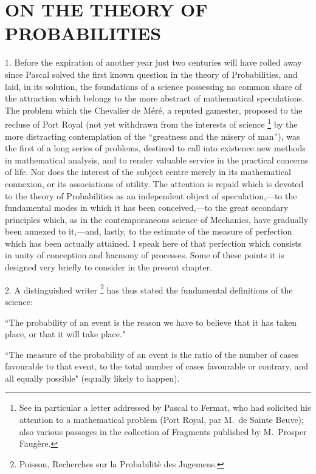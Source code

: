 \documentclass[oneside]{book}
\begin{document}
\chapter[ON THE THEORY OF PROBABILITIES.]{\large ON THE THEORY OF PROBABILITIES}

1. Before the expiration of another year just two centuries
will have rolled away since Pascal solved the first known
question in the theory of Probabilities, and laid, in its solution,
the foundations of a science possessing no common share of the
attraction which belongs to the more abstract of mathematical
speculations. The problem which the Chevalier de M\'{e}r\'{e}, a reputed
gamester, proposed to the recluse of Port Royal (not yet
withdrawn from the interests of science%
\footnote{See in particular a letter addressed by Pascal to Fermat, who had solicited
his attention to a mathematical problem (Port Royal, par M.\ de Sainte Beuve);
also various passages in the collection of Fragments published by M.\ Prosper
Faug\`{e}re.}%
 by the more distracting
contemplation of the ``greatness and the misery of man''), was
the first of a long series of problems, destined to call into existence
new methods in mathematical analysis, and to render valuable
service in the practical concerns of life. Nor does the interest
of the subject centre merely in its mathematical connexion,
or its associations of utility. The attention is repaid which is
devoted to the theory of Probabilities as an independent object
of speculation,---to the fundamental modes in which it has been
conceived,---to the great secondary principles which, as in the
contemporaneous science of Mechanics, have gradually been annexed
to it,---and, lastly, to the estimate of the measure of perfection
which has been actually attained. I speak here of that
perfection which consists in unity of conception and harmony of
processes. Some of these points it is designed very briefly to
consider in the present chapter.

2. A distinguished writer%
\footnote{Poisson, Recherches sur la Probabilit\`{e} des Jugemens.} has thus stated the fundamental
definitions of the science:

``The probability of an event is the reason we have to believe
that it has taken place, or that it will take place."

``The measure of the probability of an event is the ratio of
the number of cases favourable to that event, to the total number
of cases favourable or contrary, and all equally possible"
(equally likely to happen).
\end{document}
